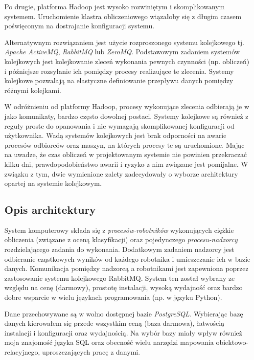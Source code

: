 \documentclass[../thesis.tex]{subfiles}
\begin{document}
Po drugie, platforma Hadoop jest wysoko rozwiniętym i skomplikowanym systemem. Uruchomienie klastra obliczeniowego wiązałoby się z długim czasem poświęconym na dostrajanie konfiguracji systemu.

Alternatywnym rozwiązaniem jest użycie rozproszonego systemu kolejkowego tj. \emph{Apache ActiveMQ}, \emph{RabbitMQ} lub \emph{ZeroMQ}. Podstawowym zadaniem systemów kolejkowych jest kolejkowanie zleceń wykonania pewnych czynności (np. obliczeń) i późniejsze rozsyłanie ich pomiędzy procesy realizujące te zlecenia. Systemy kolejkowe pozwalają na elastyczne definiowanie przepływu danych pomiędzy różnymi kolejkami. 

W odróżnieniu od platformy Hadoop, procesy wykonujące zlecenia odbierają je w jako komunikaty, bardzo często dowolnej postaci. Systemy kolejkowe są również z reguły proste do opanowania i nie wymagają skomplikowanej konfiguracji od użytkownika. Wadą systemów kolejkowych jest brak odporności na awarie procesów-odbiorców oraz maszyn, na których procesy te są uruchomione. Mając na uwadze, że czas obliczeń w projektowanym systemie nie powinien przekraczać kilku dni, prawdopodobieństwo awarii i ryzyko z nim związane jest pomijalne. W związku z tym, dwie wymienione zalety zadecydowały o wyborze architektury opartej na systemie kolejkowym.

\subsection{Opis architektury}

System komputerowy składa się z \emph{procesów-robotników} wykonujących ciężkie obliczenia (związane z oceną klasyfikacji) oraz pojedynczego \emph{procesu-nadzorcy} rozdzielającego zadania do wykonania. Dodatkowym zadaniem nadzorcy jest odbieranie cząstkowych wyników od każdego robotnika i umieszczanie ich w bazie danych. Komunikacja pomiędzy nadzorcą a robotnikami jest zapewniona poprzez zastosowanie systemu kolejkowego RabbitMQ. System ten został wybrany ze względu na cenę (darmowy), prostotę instalacji, wysoką wydajność oraz bardzo dobre wsparcie w wielu językach programowania (np. w języku Python).

Dane przechowywane są w wolno dostępnej bazie \emph{PostgreSQL}. Wybierając bazę danych kierowałem się przede wszystkim ceną (baza darmowa), łatwością instalacji i konfiguracji oraz wydajnością. Na wybór bazy miały wpływ również moja znajomość języka SQL oraz obecność wielu narzędzi mapowania obiektowo-relacyjnego, uproszczających pracę z danymi. 
\end{document}
